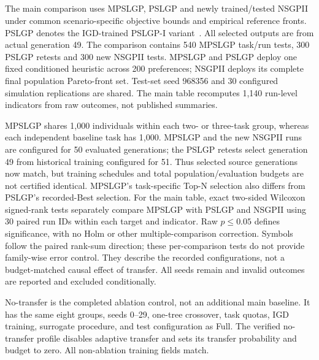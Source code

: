 \subsection{}
\begingroup
\color{resultrevision}
The main comparison uses MPSLGP, PSLGP and newly trained/tested NSGPII under common scenario-specific objective bounds and empirical reference fronts. PSLGP denotes the IGD-trained PSLGP-I variant~\cite{xu2026pslgp}. All selected outputs are from actual generation 49. The comparison contains 540 MPSLGP task/run tests, 300 PSLGP retests and 300 new NSGPII tests. MPSLGP and PSLGP deploy one fixed conditioned heuristic across 200 preferences; NSGPII deploys its complete final population Pareto-front set. Test-set seed 968356 and 30 configured simulation replications are shared. The main table recomputes 1,140 run-level indicators from raw outcomes, not published summaries.

MPSLGP shares 1,000 individuals within each two- or three-task group, whereas each independent baseline task has 1,000. MPSLGP and the new NSGPII runs are configured for 50 evaluated generations; the PSLGP retests select generation 49 from historical training configured for 51. Thus selected source generations now match, but training schedules and total population/evaluation budgets are not certified identical. MPSLGP's task-specific Top-N selection also differs from PSLGP's recorded-Best selection. For the main table, exact two-sided Wilcoxon signed-rank tests separately compare MPSLGP with PSLGP and NSGPII using 30 paired run IDs within each target and indicator. Raw $p\leq0.05$ defines significance, with no Holm or other multiple-comparison correction. Symbols follow the paired rank-sum direction; these per-comparison tests do not provide family-wise error control. They describe the recorded configurations, not a budget-matched causal effect of transfer. All seeds remain and invalid outcomes are reported and excluded conditionally.

No-transfer is the completed ablation control, not an additional main baseline. It has the same eight groups, seeds 0--29, one-tree crossover, task quotas, IGD training, surrogate procedure, and test configuration as Full. The verified no-transfer profile disables adaptive transfer and sets its transfer probability and budget to zero. All non-ablation training fields match.

